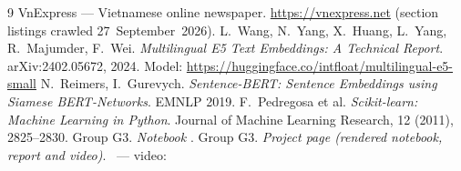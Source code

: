 \begin{thebibliography}{9}
 VnExpress — Vietnamese online newspaper. \url{https://vnexpress.net} (section listings crawled 27~September~2026).
 L.~Wang, N.~Yang, X.~Huang, L.~Yang, R.~Majumder, F.~Wei. \emph{Multilingual E5 Text Embeddings: A Technical
  Report}. arXiv:2402.05672, 2024. Model: \url{https://huggingface.co/intfloat/multilingual-e5-small}
 N.~Reimers, I.~Gurevych. \emph{Sentence-BERT: Sentence Embeddings using Siamese BERT-Networks}. EMNLP 2019.
 F.~Pedregosa et al. \emph{Scikit-learn: Machine Learning in Python}. Journal of Machine Learning
  Research, 12 (2011), 2825--2830.
 Group G3. \emph{Notebook} . \TXNotebook
{} Group G3. \emph{Project page (rendered notebook, report and video)}. \TXPage\ — video: \TXVideo
\end{thebibliography}
